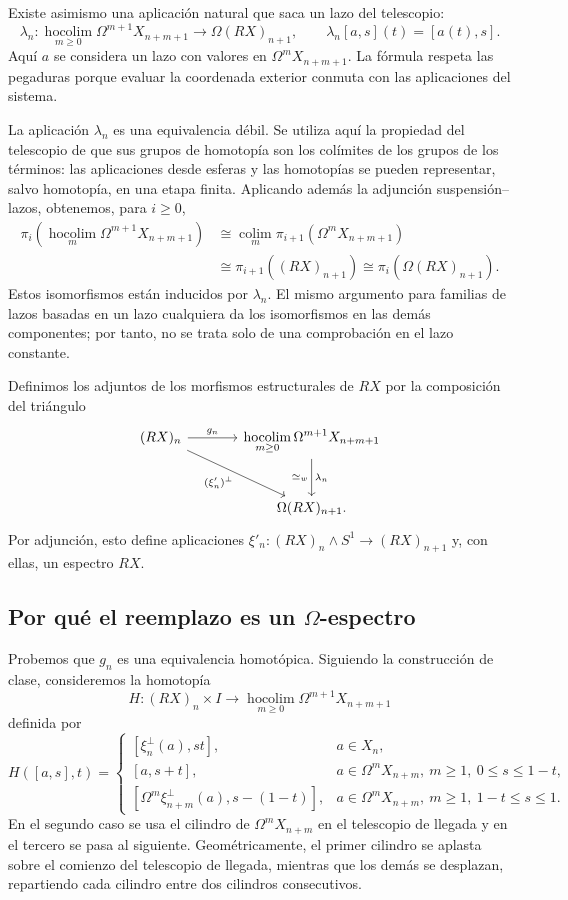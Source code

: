 Existe asimismo una aplicación natural que saca un lazo del telescopio:
\[
\lambda_n\colon
\operatorname*{hocolim}_{m\ge0}\Omega^{m+1}X_{n+m+1}
\longrightarrow\Omega(RX)_{n+1},
\qquad
\lambda_n[a,s](t)=[a(t),s].
\]
Aquí $a$ se considera un lazo con valores en $\Omega^mX_{n+m+1}$. La fórmula respeta las pegaduras porque evaluar la coordenada exterior conmuta con las aplicaciones del sistema.

La aplicación $\lambda_n$ es una equivalencia débil. Se utiliza aquí la propiedad del telescopio de que sus grupos de homotopía son los colímites de los grupos de los términos: las aplicaciones desde esferas y las homotopías se pueden representar, salvo homotopía, en una etapa finita. Aplicando además la adjunción suspensión--lazos, obtenemos, para $i\ge0$,
\[
\begin{aligned}
\pi_i\!\left(\operatorname*{hocolim}_m\Omega^{m+1}X_{n+m+1}\right)
&\cong\operatorname*{colim}_m\pi_{i+1}(\Omega^mX_{n+m+1})\\
&\cong\pi_{i+1}((RX)_{n+1})
\cong\pi_i(\Omega(RX)_{n+1}).
\end{aligned}
\]
Estos isomorfismos están inducidos por $\lambda_n$. El mismo argumento para familias de lazos basadas en un lazo cualquiera da los isomorfismos en las demás componentes; por tanto, no se trata solo de una comprobación en el lazo constante.

Definimos los adjuntos de los morfismos estructurales de $RX$ por la composición del triángulo
\[
\begin{tikzcd}[column sep=large,row sep=large]
(RX)_n \arrow[r,"g_n"] \arrow[dr,"(\xi'_n)^{\perp}"']
& \displaystyle\operatorname*{hocolim}_{m\ge0}\Omega^{m+1}X_{n+m+1}
\arrow[d,"\lambda_n", "\simeq_w"']\\
& \Omega(RX)_{n+1}.
\end{tikzcd}
\]
Por adjunción, esto define aplicaciones $\xi'_n\colon(RX)_n\wedge S^1\to(RX)_{n+1}$ y, con ellas, un espectro $RX$.

\subsection{Por qué el reemplazo es un \texorpdfstring{$\Omega$}{Omega}-espectro}

Probemos que $g_n$ es una equivalencia homotópica. Siguiendo la construcción de clase, consideremos la homotopía
\[
H\colon(RX)_n\times I\longrightarrow
\operatorname*{hocolim}_{m\ge0}\Omega^{m+1}X_{n+m+1}
\]
definida por
\[
H([a,s],t)=
\begin{cases}
[\xi_n^{\perp}(a),st],&a\in X_n,\\[2pt]
[a,s+t],&a\in\Omega^mX_{n+m},\ m\ge1,\ 0\le s\le1-t,\\[2pt]
[\Omega^m\xi_{n+m}^{\perp}(a),s-(1-t)],
&a\in\Omega^mX_{n+m},\ m\ge1,\ 1-t\le s\le1.
\end{cases}
\]
En el segundo caso se usa el cilindro de $\Omega^mX_{n+m}$ en el telescopio de llegada y en el tercero se pasa al siguiente. Geométricamente, el primer cilindro se aplasta sobre el comienzo del telescopio de llegada, mientras que los demás se desplazan, repartiendo cada cilindro entre dos cilindros consecutivos.

